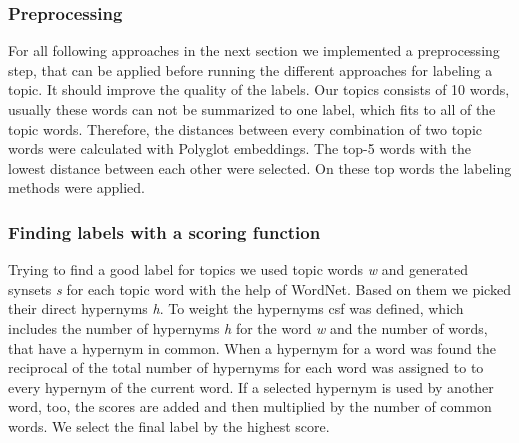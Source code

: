 \subsubsection{Preprocessing}
For all following approaches in the next section we implemented a preprocessing step, that can be applied before running the different approaches for labeling a topic. It should improve the quality of the labels. 
Our topics consists of 10 words, usually these words can not be summarized to one label, which fits to all of the topic words. Therefore, the distances between every combination of two topic words were calculated with Polyglot embeddings. The top-5 words with the lowest distance between each other were selected. On these top words the labeling methods were applied.

\subsubsection{Finding labels with a scoring function}
Trying to find a good label for topics we used topic words \textit{w} and generated synsets \textit{s} for each topic word with the help of WordNet. Based on them we picked their direct hypernyms \textit{h}. To weight the hypernyms \ac{csf} was defined, which includes the number of hypernyms \textit{h} for the word \textit{w} and the number of words, that have a hypernym in common. When a hypernym for a word was found the reciprocal of the total number of hypernyms for each word was assigned to to every hypernym of the current word. If a selected hypernym is used by another word, too, the scores are added and then multiplied by the number of common words. We select the final label by the highest score.


